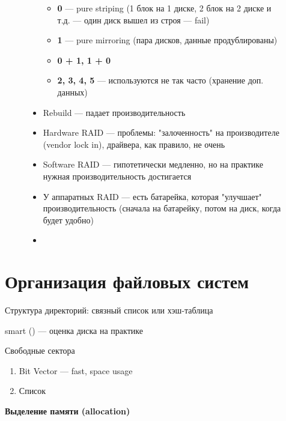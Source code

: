 \documentclass[../../lectures.tex]{subfiles}
\begin{document}
\begin{figure}[H]
\begin{minipage}[c]{0.5\linewidth}
\begin{itemize}
        \begin{itemize}
            \item \textbf{0} --- pure striping (1 блок на 1 диске, 2 блок на 2 диске и т.д. --- один диск вышел из строя --- fail)
            \item \textbf{1} --- pure mirroring (пара дисков, данные продублированы)
            \item \textbf{0 + 1, 1 + 0}
            \item \textbf{2, 3, 4, 5} --- используются не так часто (хранение доп. данных)
        \end{itemize}
    \item Rebuild --- падает производительность
    \item Hardware RAID --- проблемы: "залоченность" на производителе (vendor lock in), драйвера, как правило, не очень
    \item Software RAID --- гипотетически медленно, но на практике нужная производительность достигается
    \item У аппаратных RAID --- есть батарейка, которая "улучшает" производительность 
          (сначала на батарейку, потом на диск, когда будет удобно)
    \item {}
\end{itemize}
\end{minipage}
\end{figure}

\newpage
\section{Организация файловых систем}
Структура директорий: связный список или хэш-таблица

smart () --- оценка диска на практике

Свободные сектора
\begin{enumerate}
    \item Bit Vector --- fast, space usage
    \item Список
\end{enumerate}

\begin{center}\textbf{Выделение памяти (allocation)}\end{center}
\end{document}
